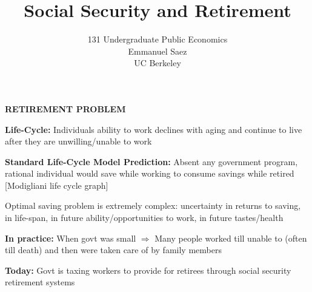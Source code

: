 \documentclass[landscape]{slides}
\author{131 Undergraduate Public Economics \\ Emmanuel Saez \\ UC Berkeley}
\date{}
\title{Social Security and Retirement} \onlyslides{1-300}
\begin{document}
\begin{slide}
\maketitle
\end{slide}

%
%
%
%
%
%
%




\begin{slide}
\begin{center}
{\bf RETIREMENT PROBLEM}
\end{center}

{\bf Life-Cycle:} Individuals ability to work declines with aging and
continue to live after they are unwilling/unable to
work

{\bf Standard Life-Cycle Model Prediction:} Absent any government program,
rational individual would save while working to consume savings
while retired [Modigliani life cycle graph] 

Optimal saving problem is extremely complex: uncertainty in
returns to saving, in life-span, in future ability/opportunities
to work, in future tastes/health

{\bf In practice:} When govt was small $\Rightarrow$ Many people
worked till unable to (often till death) and then were taken care
of by family members 

{\bf Today:} Govt is taxing workers to provide for retirees through
social security retirement systems




\begin{slide}

\end{slide}

\end{slide}
\begin{slide}

\end{slide}
\end{document}
